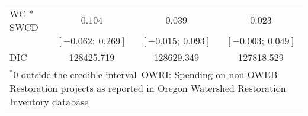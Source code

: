 \begin{table}
\begin{center}
\begin{tabular}{l c c c }
WC * SWCD        & $0.104$             & $0.039$             & $0.023$             \\
                 & $[-0.062;\ 0.269]$  & $[-0.015;\ 0.093]$  & $[-0.003;\ 0.049]$  \\
\hline
DIC              & 128425.719          & 128629.349          & 127818.529          \\
\hline
\multicolumn{4}{l}{\scriptsize{$^* 0$ outside the credible interval\
       OWRI: Spending on non-OWEB Restoration projects as reported in Oregon Watershed Restoration Inventory database}}
\end{tabular}
\label{table:basemods}
\end{center}
\end{table}
